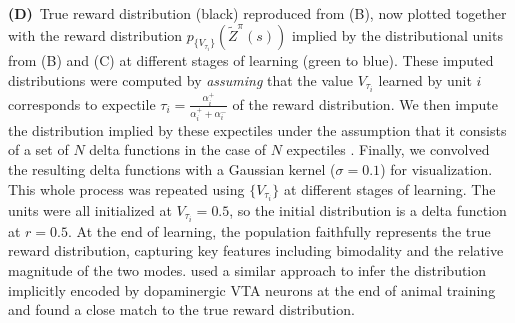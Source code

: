\begin{figure*}[!t]
{        {\bfseries (D)}~True reward distribution (black) reproduced from (B), now plotted together with the reward distribution $p_{\{ V_{\tau_i} \} }(\tilde{Z}^\pi(s))$ implied by the distributional units from (B) and (C) at different stages of learning (green to blue).
        These imputed distributions were computed by \emph{assuming} that the value $V_{\tau_i}$ learned by unit $i$ corresponds to expectile $\tau_i = \frac{\alpha_i^+}{\alpha_i^+ + \alpha_i^-}$ of the reward distribution.
        We then impute the distribution implied by these expectiles under the assumption that it consists of a set of $N$ delta functions in the case of $N$ expectiles \citep{rowland2019statistics}.
        Finally, we convolved the resulting delta functions with a Gaussian kernel ($\sigma = 0.1$) for visualization.
        This whole process was repeated using $\{V_{\tau_i}\}$ at different stages of learning.
        The units were all initialized at $V_{\tau_i} = 0.5$, so the initial distribution is a delta function at $r = 0.5$.
        At the end of learning, the population faithfully represents the true reward distribution, capturing key features including bimodality and the relative magnitude of the two modes.
        \citet{dabney2020distributional} used a similar approach to infer the distribution implicitly encoded by dopaminergic VTA neurons at the end of animal training and found a close match to the true reward distribution.
        }
    \vspace*{-1.0em}
\end{figure*}


